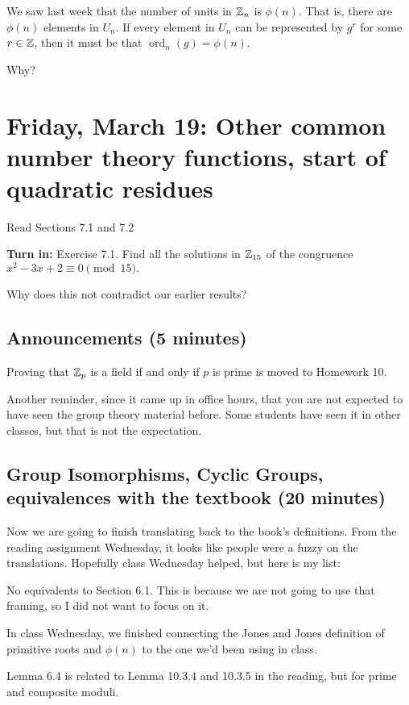 \documentclass[letterpaper, 11 pt]{article}
\newcommand{\ord}{\operatorname{ord}}
\begin{document}
\begin{br}[1 min]
We saw last week that the number of units in $\mathbb Z_n$ is $\phi(n)$. That is, there are $\phi(n)$ elements in $U_n$. If every element in $U_n$ can be represented by $g^r$ for some $r\in \mathbb Z$, then it must be that $\ord_n(g)=\phi(n)$.

Why? 
\end{br}

\section{Friday, March 19: Other common number theory functions, start of quadratic residues}
Read Sections 7.1 and 7.2 

{\bf Turn in:} Exercise 7.1. Find all the solutions in $\mathbb Z_{15}$ of the congruence $x^2- 3x+2\equiv 0 \pmod{15}.$

Why does this not contradict our earlier results?
\subsection{Announcements (5 minutes)}

Proving that $\mathbb Z_p$ is a field if and only if $p$ is prime is moved to Homework 10.

Another reminder, since it came up in office hours, that you are not expected to have seen the group theory material before. Some students have seen it in other classes, but that is not the expectation.
\subsection{Group Isomorphisms, Cyclic Groups, equivalences with the textbook (20 minutes)}
Now we are going to finish translating back to the book's definitions. From the reading assignment Wednesday, it looks like people were a fuzzy on the translations. Hopefully class Wednesday helped, but here is my list:

No equivalents to Section 6.1. This is because we are not going to use that framing, so I did not want to focus on it.

In class Wednesday, we finished connecting the Jones and Jones definition of primitive roots and $\phi(n)$ to the one we'd been using in class.

Lemma 6.4 is related to Lemma 10.3.4 and 10.3.5 in the reading, but for prime and composite moduli.
\end{document}
